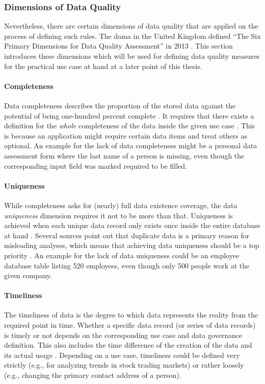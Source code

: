 \subsubsection{Dimensions of Data Quality}
Nevertheless, there are certain dimensions of data quality that are applied on the process of defining such rules. The \ac{dama} in the United Kingdom defined \enquote{The Six Primary Dimensions for Data Quality Assessment} in 2013 \cite[7\psqq]{Askham2013}. This section introduces these dimensions which will be used for defining data quality measures for the practical use case at hand at a later point of this thesis.

\paragraph{Completeness}
Data completeness describes the proportion of the stored data against the potential of being one-hundred percent complete \cite[8]{Askham2013}\cite{Shen2019}. It requires that there exists a definition for the \textit{whole} completeness of the data inside the given use case \cite[8]{Askham2013}. This is because an application might require certain data items and treat others as optional. An example for the lack of data completeness might be a personal data assessment form where the last name of a person is missing, even though the corresponding input field was marked required to be filled.

\paragraph{Uniqueness}
While completeness asks for (nearly) full data existence coverage, the data \textit{uniqueness} dimension requires it not to be more than that. Uniqueness is achieved when each unique data record only exists once inside the entire database at hand \cite[9]{Askham2013}. Several sources point out that duplicate data is a primary reason for misleading analyses, which means that achieving data uniqueness should be a top priority \cite{Shen2019}\cite[677\psq]{Souibgui2019}. An example for the lack of data uniqueness could be an employee database table listing 520 employees, even though only 500 people work at the given company.

\paragraph{Timeliness}
The timeliness of data is the degree to which data represents the reality from the required point in time. Whether a specific data record (or series of data records) is timely or not depends on the corresponding use case and data governance definition. This also includes the time difference of the creation of the data and its actual usage \cite[10]{Askham2013}. Depending on a use case, timeliness could be defined very strictly (e.g., for analyzing trends in stock trading markets) or rather loosely (e.g., changing the primary contact address of a person).

